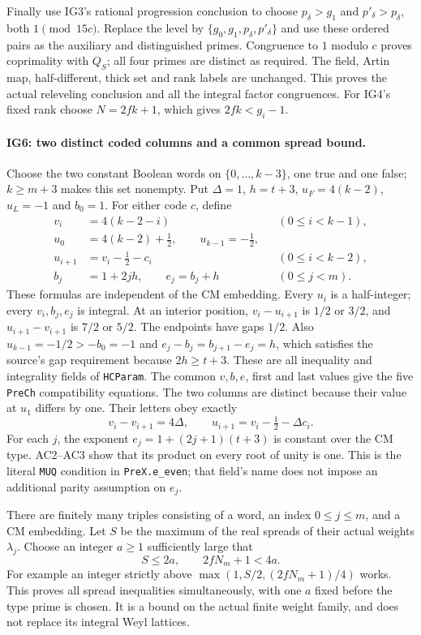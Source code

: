 Finally use IG3's rational progression conclusion to choose
$p_\delta>g_1$ and $p'_\delta>p_\delta$, both
$1\pmod {15c}$. Replace the level by
$\{g_0,g_1,p_\delta,p'_\delta\}$ and use these ordered pairs
as the auxiliary and distinguished primes. Congruence to $1$
modulo $c$ proves coprimality with $Q_S$; all four primes are
distinct as required. The field, Artin map, half-different,
thick set and rank labels are unchanged. This proves the actual
releveling conclusion and all the integral factor congruences.
For IG4's fixed rank choose $N=2fk+1$, which gives
$2fk<g_i-1$.

\paragraph{IG6: two distinct coded columns and a common spread bound.}
Choose the two constant Boolean words on $\{0,\ldots,k-3\}$,
one true and one false; $k\ge m+3$ makes this set nonempty.
Put $\Delta=1$, $h=t+3$, $u_F=4(k-2)$, $u_L=-1$ and $b_0=1$.
For either code $c$, define
\[
 \begin{split}
 v_i&=4(k-2-i) &&(0\le i<k-1),\\
 u_0&=4(k-2)+\tfrac12,\qquad u_{k-1}=-\tfrac12,\\
 u_{i+1}&=v_i-\tfrac12-c_i &&(0\le i<k-2),\\
 b_j&=1+2jh,\qquad e_j=b_j+h &&(0\le j<m).
 \end{split}                                                   \tag{IG.22}
\]
These formulas are independent of the CM embedding. Every
$u_i$ is a half-integer; every $v_i,b_j,e_j$ is integral.
At an interior position, $v_i-u_{i+1}$ is $1/2$ or $3/2$,
and $u_{i+1}-v_{i+1}$ is $7/2$ or $5/2$.
The endpoints have gaps $1/2$. Also
$u_{k-1}=-1/2>-b_0=-1$ and
$e_j-b_j=b_{j+1}-e_j=h$, which satisfies the source's
gap requirement because $2h\ge t+3$.
These are all inequality and integrality fields of
\texttt{HCParam}. The common $v,b,e$, first and last values
give the five \texttt{PreCh} compatibility equations.
The two columns are distinct because their value at $u_1$
differs by one. Their letters obey exactly
\[
       v_i-v_{i+1}=4\Delta,\qquad
       u_{i+1}=v_i-\tfrac12-\Delta c_i.                \tag{IG.23}
\]
For each $j$, the exponent $e_j=1+(2j+1)(t+3)$ is constant
over the CM type. AC2--AC3 show that its product on every
root of unity is one. This is the literal \texttt{MUQ}
condition in \texttt{PreX.e\_even}; that field's name does
not impose an additional parity assumption on $e_j$.

There are finitely many triples consisting of a word, an index
$0\le j\le m$, and a CM embedding. Let $S$ be the maximum of
the real spreads of their actual weights $\lambda_j$.
Choose an integer $a\ge1$ sufficiently large that
\[
                 S\le2a,\qquad 2fN_m+1<4a.           \tag{IG.24}
\]
For example an integer strictly above
$\max(1,S/2,(2fN_m+1)/4)$ works. This proves all spread
inequalities simultaneously, with one $a$ fixed before the
type prime is chosen. It is a bound on the actual finite weight
family, and does not replace its integral Weyl lattices.

